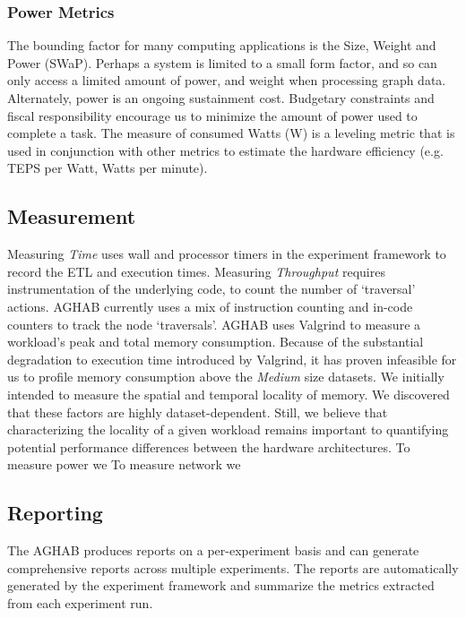     \subsubsection{Power Metrics}
    The bounding factor for many computing applications is the Size, Weight and Power (SWaP). 
    Perhaps a system is limited to a small form factor, and so can only access a limited amount of power, and weight when processing graph data. 
    Alternately, power is an ongoing sustainment cost. 
    Budgetary constraints and fiscal responsibility encourage us to minimize the amount of power used to complete a task. 
    The measure of consumed Watts (W) is a leveling metric that is used in conjunction with other metrics to estimate the hardware efficiency (e.g. TEPS per Watt, Watts per minute).

    \subsection{Measurement}

    Measuring \textit{Time} uses wall and processor timers in the experiment framework to record the ETL and execution times. 
    Measuring \textit{Throughput} requires instrumentation of the underlying code, to count the number of `traversal' actions.
    AGHAB currently uses a mix of instruction counting and in-code counters to track the node `traversals'. 
    AGHAB uses Valgrind to measure a workload's peak and total memory consumption. Because of the substantial degradation to execution time introduced by Valgrind, it has proven infeasible for us to profile memory consumption above the \textit{Medium} size datasets. 
    We initially intended to measure the spatial and temporal locality of memory. We discovered that these factors are highly dataset-dependent. Still, we believe that characterizing the locality of a given workload remains important to quantifying potential performance differences between the hardware architectures. 
    To measure power we 
    To measure network we 

    \subsection{Reporting}
    The AGHAB produces reports on a per-experiment basis and can generate comprehensive reports across multiple experiments. 
    The reports are automatically generated by the experiment framework and summarize the metrics extracted from each experiment run. 